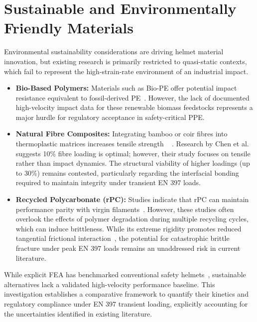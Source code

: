 \section{Sustainable and Environmentally Friendly Materials}
Environmental sustainability considerations are driving helmet material 
innovation, but existing research is primarily restricted to 
quasi-static contexts, which fail to represent the high-strain-rate 
environment of an industrial impact.
\begin{itemize}
    \item \textbf{Bio-Based Polymers:} Materials such as Bio-PE offer 
    potential impact resistance equivalent to fossil-derived PE~\cite{alvarez2022}. 
    However, the lack of documented high-velocity impact data for these 
    renewable biomass feedstocks represents a major hurdle for regulatory 
    acceptance in safety-critical PPE.
    \item \textbf{Natural Fibre Composites:} Integrating bamboo or coir 
    fibres into thermoplastic matrices increases tensile strength 
  ~ \cite{obele2015, chandramohan2015}. Research by Chen et al. \cite{chen2020} 
    suggests 10\% fibre loading is optimal; however, their study 
    focuses on tensile rather than impact dynamics. The structural 
    viability of higher loadings (up to 30\%) remains contested, 
    particularly regarding the interfacial bonding required to maintain 
    integrity under transient EN 397 loads.
    \item \textbf{Recycled Polycarbonate (rPC):} Studies indicate that rPC 
    can maintain performance parity with virgin filaments~\cite{baechler2013}. 
    However, these studies often overlook the effects of polymer 
    degradation during multiple recycling cycles, which can induce 
    brittleness. While its extreme rigidity promotes reduced tangential 
    frictional interaction~\cite{mills2011}, the potential for catastrophic 
    brittle fracture under peak EN 397 loads remains an unaddressed risk 
    in current literature.
\end{itemize}

While explicit FEA has benchmarked conventional safety helmets~\cite{long2015, wu2022}, 
sustainable alternatives lack a validated high-velocity performance baseline. 
This investigation establishes a 
comparative framework to quantify their kinetics and regulatory compliance 
under EN 397 transient loading, explicitly accounting for the uncertainties 
identified in existing literature.

